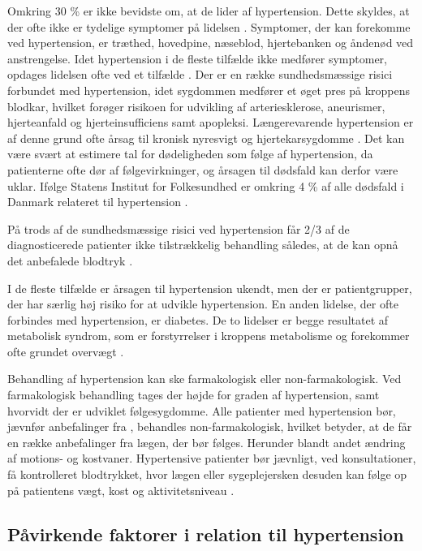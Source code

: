 \noindent
Omkring 30 \% er ikke bevidste om, at de lider af hypertension. Dette skyldes, at der ofte ikke er tydelige symptomer på lidelsen \cite{kronborg2008}. Symptomer, der kan forekomme ved hypertension, er træthed, hovedpine, næseblod, hjertebanken og åndenød ved anstrengelse. Idet hypertension i de fleste tilfælde ikke medfører symptomer, opdages lidelsen ofte ved et tilfælde \cite{olsen2015}.
Der er en række sundhedsmæssige risici forbundet med hypertension, idet sygdommen medfører et øget pres på kroppens blodkar, hvilket forøger risikoen for udvikling af arteriesklerose, aneurismer, hjerteanfald og hjerteinsufficiens samt apopleksi. Længerevarende hypertension er af denne grund ofte årsag til kronisk nyresvigt og hjertekarsygdomme \cite{martini2015}. Det kan være svært at estimere tal for dødeligheden som følge af hypertension, da patienterne ofte dør af følgevirkninger, og årsagen til dødsfald kan derfor være uklar. Ifølge Statens Institut for Folkesundhed er omkring 4 \% af alle dødsfald i Danmark relateret til hypertension \cite{juel2006}.
 
På trods af de sundhedsmæssige risici ved hypertension får 2/3 af de diagnosticerede patienter ikke tilstrækkelig behandling således, at de kan opnå det anbefalede blodtryk \cite{paulsen2012}.


I de fleste tilfælde er årsagen til hypertension ukendt, men der er patientgrupper, der har særlig høj risiko for at udvikle hypertension. En anden lidelse, der ofte forbindes med hypertension, er diabetes. De to lidelser er begge resultatet af metabolisk syndrom, som er forstyrrelser i kroppens metabolisme og forekommer ofte grundet overvægt \cite{cheung2012}.

Behandling af hypertension kan ske farmakologisk eller non-farmakologisk. Ved farmakologisk behandling tages der højde for graden af hypertension, samt hvorvidt der er udviklet følgesygdomme. Alle patienter med hypertension bør, jævnfør anbefalinger fra \citeauthor{bech2015}, behandles non-farmakologisk, hvilket betyder, at de får en række anbefalinger fra lægen, der bør følges. Herunder blandt andet ændring af motions- og kostvaner. Hypertensive patienter bør jævnligt, ved konsultationer, få kontrolleret blodtrykket, hvor lægen eller sygeplejersken desuden kan følge op på patientens vægt, kost og aktivitetsniveau \cite{lodberg2016, bech2015}. 

\subsection{Påvirkende faktorer i relation til hypertension}

